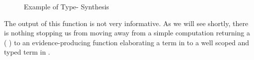 \begin{figure}[h!]
\caption{Example of Type- Synthesis\label{defn:BidiSemantics}}
\end{figure}

The output of this function is not very informative. As we will see shortly,
there is nothing stopping us from moving away from a simple computation
returning a {( )} to an evidence-producing function
elaborating a term in  to a well scoped and typed term in
.
